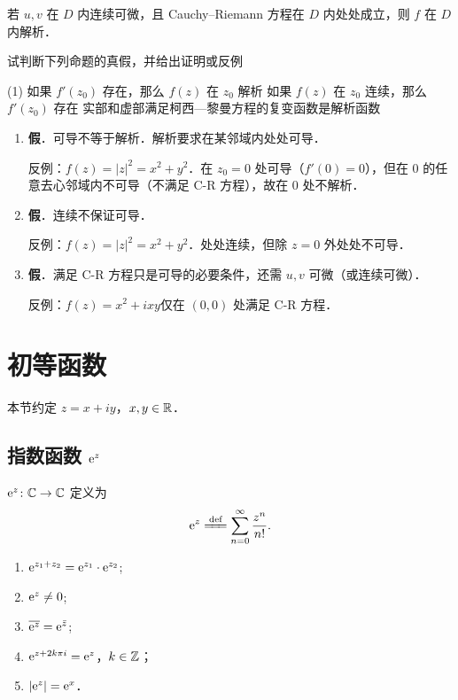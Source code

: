 \documentclass[12pt, a4paper, oneside, UTF8]{ctexbook}
\begin{document}
\begin{remark}
若 $u,v$ 在 $D$ 内连续可微，且 Cauchy--Riemann 方程在 $D$ 内处处成立，则 $f$ 在 $D$ 内解析．
\end{remark}

\begin{example}
    试判断下列命题的真假，并给出证明或反例
    \begin{tasks}[label-width=1.2em, label=(\arabic*)](1)
        \task 如果 $f'(z_0)$ 存在，那么 $f(z)$ 在 $z_0$ 解析
        \task 如果 $f(z)$ 在 $z_0$ 连续，那么 $f'(z_0)$ 存在
        \task 实部和虚部满足柯西—黎曼方程的复变函数是解析函数
    \end{tasks}
\end{example}
\begin{solution}
    \begin{enumerate}[label=(\arabic*)]
        \item \textbf{假}．可导不等于解析．解析要求在某邻域内处处可导．

            反例：$f(z) = |z|^2 = x^2+y^2$．在 $z_0=0$ 处可导（$f'(0)=0$），但在 $0$ 的任意去心邻域内不可导（不满足 C-R 方程），故在 $0$ 处不解析．
        \item \textbf{假}．连续不保证可导．
            
            反例：$f(z) = |z|^2 = x^2+y^2$．处处连续，但除 $z=0$ 外处处不可导．
        \item \textbf{假}．满足 C-R 方程只是可导的必要条件，还需 $u,v$ 可微（或连续可微）．
            
            反例：$f(z) = x^2+ixy$仅在 $(0,0)$ 处满足 C-R 方程．
    \end{enumerate}
\end{solution}

\section{初等函数}
本节约定 $z=x+iy$，$x,y\in\mathbb{R}$．

\subsection{指数函数 $\mathrm{e}^z$}
\begin{definition}[指数函数]
${\mathrm{e}}^z\colon\mathbb{C}\to\mathbb{C}$ 定义为
\[
\e^z \defeq \sum_{n=0}^{\infty}\frac{z^n}{n!}.
\]
\end{definition}

\begin{theorem}[指数函数的性质]
\begin{enumerate}
    \item $\mathrm{e}^{z_1+z_2} = \mathrm{e}^{z_1}\cdot \mathrm{e}^{z_2}$;
    \item $\mathrm{e}^z \neq 0$;
    \item $\overline{\mathrm{e}^z} = \mathrm{e}^{\bar{z}}$;
    \item $\mathrm{e}^{z+2k\pi i}=\mathrm{e}^z$，$k\in\mathbb{Z}$；
    \item $\abs{\mathrm{e}^z} = \mathrm{e}^x$．
\end{enumerate}
\end{theorem}
\end{document}
